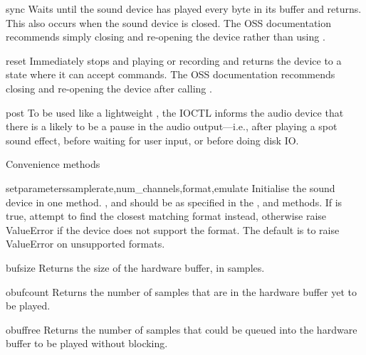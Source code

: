 \begin{methoddesc}{sync}
Waits until the sound device has played every byte in its buffer and
returns.  This also occurs when the sound device is closed.  The OSS
documentation recommends simply closing and re-opening the device rather
than using .
\end{methoddesc}

\begin{methoddesc}{reset}
Immediately stops and playing or recording and returns the device to a
state where it can accept commands.  The OSS documentation recommends
closing and re-opening the device after calling .
\end{methoddesc}

\begin{methoddesc}{post}
To be used like a lightweight , the  IOCTL informs
the audio device that there is a likely to be a pause in the audio
output---i.e., after playing a spot sound effect, before waiting for
user input, or before doing disk IO.
\end{methoddesc}

Convenience methods

\begin{methoddesc}{setparameters}{samplerate,num_channels,format,emulate}
Initialise the sound device in one method.  ,
 and  should be as specified in the
,  and  methods.  If
 is true, attempt to find the closest matching format
instead, otherwise raise ValueError if the device does not support the
format.  The default is to raise ValueError on unsupported formats.
\end{methoddesc}

\begin{methoddesc}{bufsize}{}
Returns the size of the hardware buffer, in samples.
\end{methoddesc}

\begin{methoddesc}{obufcount}{}
Returns the number of samples that are in the hardware buffer yet to be
played.
\end{methoddesc}

\begin{methoddesc}{obuffree}{}
Returns the number of samples that could be queued into the hardware
buffer to be played without blocking.
\end{methoddesc}


